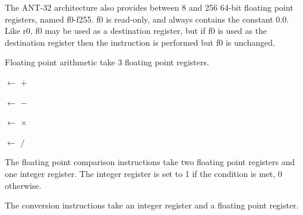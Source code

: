 
The ANT-32 architecture also provides between 8 and 256 64-bit floating point
registers, named f0-f255.  f0 is read-only, and always contains the
constant 0.0.  Like r0, f0 may be used as a destination register, but
if f0 is used as the destination register then the instruction is
performed but f0 is unchanged.

Floating point arithmetic take 3 floating point registers. 

\begin{description}

\item {}

	 $\leftarrow$  $+$ 

\item {}

	 $\leftarrow$  $-$ 

\item {}

	 $\leftarrow$  $\times$ 

\item {}

	 $\leftarrow$  $/$ 

\end{description}

The floating point comparison instructions take two floating point
registers and one integer register.  The integer register is set to 1
if the condition is met, 0 otherwise.

\begin{description}

\item {}
\item {}
\item {}

\end{description}

The conversion instructions take an integer register and a floating
point register.

